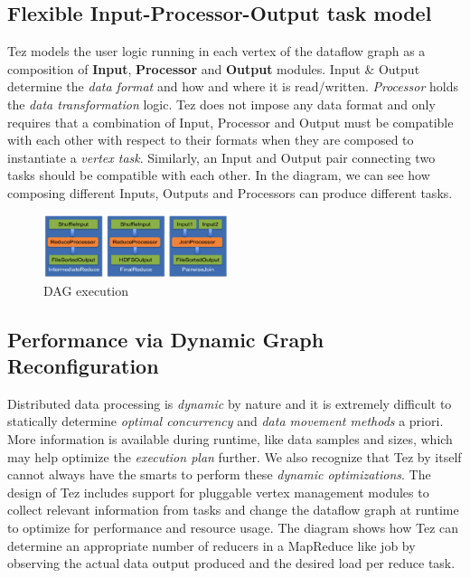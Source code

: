 \documentclass[twocolumn]{article}
\begin{document}
\subsection{Flexible Input-Processor-Output task model}

Tez models the user logic running in each vertex of the dataflow graph
as a composition of \textbf{Input}, \textbf{Processor} and
\textbf{Output} modules. Input \& Output determine the \emph{data
format} and how and where it is read/written. \emph{Processor} holds the
\emph{data transformation} logic. Tez does not impose any data format
and only requires that a combination of Input, Processor and Output must
be compatible with each other with respect to their formats when they
are composed to instantiate a \emph{vertex task}. Similarly, an Input
and Output pair connecting two tasks should be compatible with each
other. In the diagram, we can see how composing different Inputs,
Outputs and Processors can produce different tasks.

\begin{figure}[htb]
        \centering
        \includegraphics[width=0.48\textwidth]{tez2}
        \caption{DAG execution}
        \label{fig04}
\end{figure}

\subsection{Performance via Dynamic Graph Reconfiguration}

Distributed data processing is \emph{dynamic} by nature and it is
extremely difficult to statically determine \emph{optimal concurrency}
and \emph{data movement methods} a priori. More information is available
during runtime, like data samples and sizes, which may help optimize the
\emph{execution plan} further. We also recognize that Tez by itself
cannot always have the smarts to perform these \emph{dynamic
optimizations}. The design of Tez includes support for pluggable vertex
management modules to collect relevant information from tasks and change
the dataflow graph at runtime to optimize for performance and resource
usage. The diagram shows how Tez can determine an appropriate number of
reducers in a MapReduce like job by observing the actual data output
produced and the desired load per reduce task.
\end{document}
